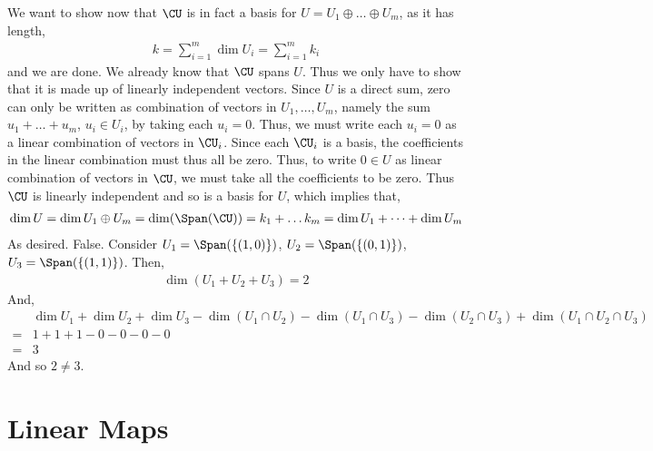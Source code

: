 \documentclass{book}
\begin{document}
\begin{enumerate}[label=\arabic*)]
      We want to show now that $\CU$ is in fact a basis for $U = U_1 \oplus \dots \oplus U_m$, as it has length, 
      \begin{align*}
        k = \sum_{i = 1}^{m}\dim U_i = \sum_{i = 1}^{m}k_i
      \end{align*}
      and we are done. We already know that $\CU$ spans $U$. Thus we only have to show that it is made up of linearly independent vectors. Since $U$ is a direct sum, zero can
      only be written as combination of vectors in $U_1, \dots, U_m$, namely the sum $u_1 + \dots + u_m$, $u_i \in U_i$, by taking each $u_i = 0$. Thus, we must write each
      $u_i = 0$ as a linear combination of vectors in $\CU_i$. Since each $\CU_i$ is a basis, the coefficients in the linear combination must thus all be zero. Thus, to write
      $0 \in U$ as linear combination of vectors in $\CU$, we must take all the coefficients to be zero. Thus $\CU$ is linearly independent and so is a basis for $U$, which
      implies that,
      \begin{align*}
        \dim U = \dim U_1 \oplus U_m = \dim(\Span(\CU)) = k_1 + \dots k_m = \dim U_1 + \dots + \dim U_m
      \end{align*}
      As desired.
    \ii
      False. Consider $U_1 = \Span(\{(1, 0)\})$, $U_2 = \Span(\{(0, 1)\})$, $U_3 = \Span(\{(1, 1)\})$. Then,
      \begin{align*}
        \dim(U_1 + U_2 + U_3) = 2 
      \end{align*}
      And,
      \begin{align*}
       & \dim U_1 + \dim U_2 + \dim U_3 - \dim(U_1 \cap U_2) - \dim(U_1 \cap U_3) - \dim(U_2 \cap U_3) + \dim (U_1 \cap U_2 \cap U_3) \\
       = & 1 + 1 + 1 - 0 - 0 - 0 - 0 \\
       = & 3
      \end{align*}
      And so $2 \neq 3$.
  \end{enumerate}
\chapter{Linear Maps}
\end{document}
